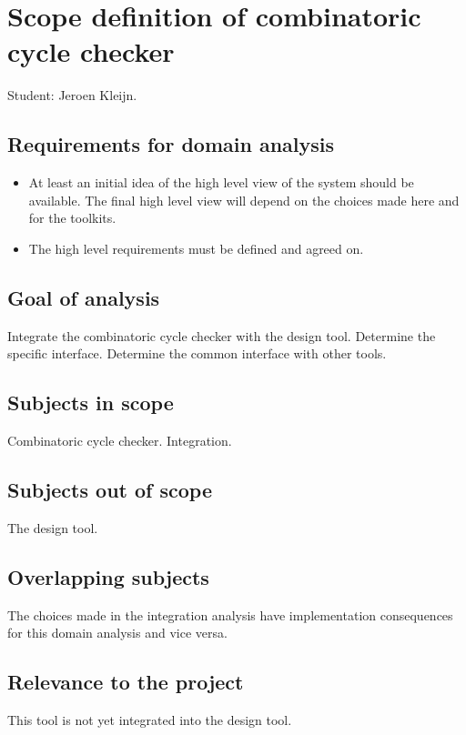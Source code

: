 \documentclass[a4paper,11pt]{article}
\begin{document}
\section{Scope definition of combinatoric cycle checker}
Student: Jeroen Kleijn.
\subsection{Requirements for domain analysis}
\begin{itemize}
    \item At least an initial idea of the high level view of the system should be available. The final high level
	    view will depend on the choices made here and for the toolkits.
    \item The high level requirements must be defined and agreed on.
\end{itemize}
\subsection{Goal of analysis}
Integrate the combinatoric cycle checker with the design tool. Determine the specific interface. Determine the common interface
with other tools.
\subsection{Subjects in scope}
Combinatoric cycle checker. Integration.
\subsection{Subjects out of scope}
The design tool.
\subsection{Overlapping subjects}
The choices made in the integration analysis have implementation consequences for this domain analysis and vice versa.
\subsection{Relevance to the project}
This tool is not yet integrated into the design tool.
\end{document}
